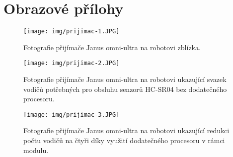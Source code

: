 \chapter{Obrazové přílohy}

\begin{figure}[htbp]
    \centering
    \texttt{[image: img/prijimac-1.JPG]}
    \caption{Fotografie přijímače Janus omni-ultra na robotovi zblízka.}
    \label{fig:prijimac1}
\end{figure}

\begin{figure}[htbp]
    \centering
    \texttt{[image: img/prijimac-2.JPG]}
    \caption{Fotografie přijímače Janus omni-ultra na robotovi ukazující svazek vodičů potřebných pro obsluhu senzorů HC-SR04 bez dodatečného procesoru.}
    \label{fig:prijimac2}
\end{figure}

\begin{figure}[htbp]
    \centering
    \texttt{[image: img/prijimac-3.JPG]}
    \caption{Fotografie přijímače Janus omni-ultra na robotovi ukazující redukci počtu vodičů na čtyři díky využití dodatečného procesoru v rámci modulu.}
    \label{fig:prijimac3}
\end{figure}

\newpage



